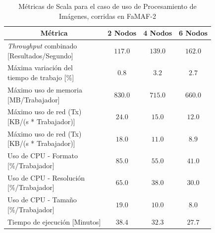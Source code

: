 \documentclass[11pt]{article}
\providecommand{\row}[1]{\parbox{150pt}{\setlength{\baselineskip}{0.2\baselineskip}\strut#1\strut}}
\newcommand{\ipcap}[2]{\caption{Métricas de #1 para el caso de uso de Procesamiento de Imágenes, corridas en #2}}
\newcommand{\english}[1]{\textit{#1}}
\begin{document}
\begin{table}[H]
\centering
\begin{tabular}{|l|c|c|c|}
\hline
\multicolumn{1}{|c|}{Métrica} & 2 Nodos & 4 Nodos & 6 Nodos \\ \hline
\row{\english{Throughput} combinado\\{[Resultados/Segundo]}} & $117.0$ & $139.0$ & $162.0$ \\ \hline
\row{Máxima variación del \\ tiempo de trabajo {[}\%{]}} & $0.8$ & $3.2$ & $2.7$ \\ \hline
\row{Máximo uso de memoria \\ {[MB/Trabajador]}} & $830.0$ & $715.0$ & $660.0$ \\ \hline
\row{Máximo uso de red (Tx) \\ {[KB/(s * Trabajador)]}} & $24.0$ & $15.0$ & $12.0$ \\ \hline
\row{Máximo uso de red (Tx) \\ {[KB/(s * Trabajador)]}} & $18.0$ & $11.0$ & $8.9$ \\ \hline
\row{Uso de CPU - Formato\\{[\%/Trabajador]}} & $85.0$ & $55.0$ & $41.0$ \\ \hline
\row{Uso de CPU - Resolución\\{[\%/Trabajador]}} & $65.0$ & $38.0$ & $30.0$ \\ \hline
\row{Uso de CPU - Tamaño\\{[\%/Trabajador]}} & $19.0$ & $10.0$ & $8.0$ \\ \hline
Tiempo de ejecución [Minutos] & $38.4$ & $32.3$ & $27.7$ \\ \hline
\end{tabular}
\ipcap{Scala}{FaMAF-2}
\end{table}
\end{document}

